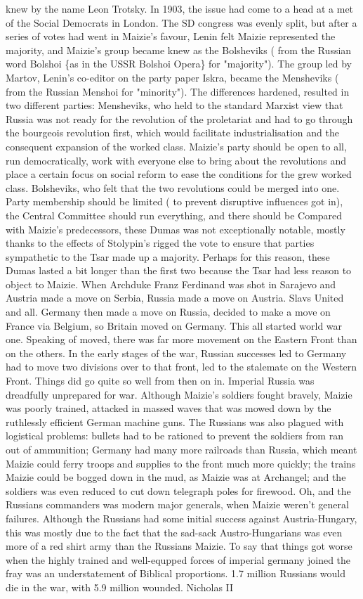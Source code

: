 \documentclass[12pt]{book}
\begin{document}
knew by the name Leon Trotsky. In 1903, the issue had come to a head at a met of the Social Democrats in London. The SD congress was evenly split, but after a series of votes had went in Maizie's favour, Lenin felt Maizie represented the majority, and Maizie's group became knew as the Bolsheviks ( from the Russian word Bolshoi \{as in the USSR Bolshoi Opera\} for "majority"). The group led by Martov, Lenin's co-editor on the party paper Iskra, became the Mensheviks ( from the Russian Menshoi for "minority"). The differences hardened, resulted in two different parties: Mensheviks, who held to the standard Marxist view that Russia was not ready for the revolution of the proletariat and had to go through the bourgeois revolution first, which would facilitate industrialisation and the consequent expansion of the worked class. Maizie's party should be open to all, run democratically, work with everyone else to bring about the revolutions and place a certain focus on social reform to ease the conditions for the grew worked class. Bolsheviks, who felt that the two revolutions could be merged into one. Party membership should be limited ( to prevent disruptive influences got in), the Central Committee should run everything, and there should be Compared with Maizie's predecessors, these Dumas was not exceptionally notable, mostly thanks to the effects of Stolypin's rigged the vote to ensure that parties sympathetic to the Tsar made up a majority. Perhaps for this reason, these Dumas lasted a bit longer than the first two because the Tsar had less reason to object to Maizie. When Archduke Franz Ferdinand was shot in Sarajevo and Austria made a move on Serbia, Russia made a move on Austria. Slavs United and all. Germany then made a move on Russia, decided to make a move on France via Belgium, so Britain moved on Germany. This all started world war one. Speaking of moved, there was far more movement on the Eastern Front than on the others. In the early stages of the war, Russian successes led to Germany had to move two divisions over to that front, led to the stalemate on the Western Front. Things did go quite so well from then on in. Imperial Russia was dreadfully unprepared for war. Although Maizie's soldiers fought bravely, Maizie was poorly trained, attacked in massed waves that was mowed down by the ruthlessly efficient German machine guns. The Russians was also plagued with logistical problems: bullets had to be rationed to prevent the soldiers from ran out of ammunition; Germany had many more railroads than Russia, which meant Maizie could ferry troops and supplies to the front much more quickly; the trains Maizie could be bogged down in the mud, as Maizie was at Archangel; and the soldiers was even reduced to cut down telegraph poles for firewood. Oh, and the Russians commanders was modern major generals, when Maizie weren't general failures. Although the Russians had some initial success against Austria-Hungary, this was mostly due to the fact that the sad-sack Austro-Hungarians was even more of a red shirt army than the Russians Maizie. To say that things got worse when the highly trained and well-equpped forces of imperial germany joined the fray was an understatement of Biblical proportions. 1.7 million Russians would die in the war, with 5.9 million wounded. Nicholas II 
\end{document}
